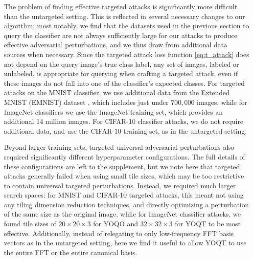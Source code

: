 \documentclass[letterpaper]{article}
\begin{document}
	The problem of finding effective targeted attacks is significantly more difficult than the untargeted setting. This is reflected in several necessary changes to our algorithm; most notably, we find that the datasets used in the previous section to query the classifier are not always sufficiently large for our attacks to produce effective adversarial perturbations, and we thus draw from additional data sources when necessary. Since the targeted attack loss function \eqref{eq:t_attack} does not depend on the query image's true class label, any set of images, labeled or unlabeled, is appropriate for querying when crafting a targeted attack, even if these images do not fall into one of the classifier's expected classes. For targeted attacks on the MNIST classifier, we use additional data from the Extended MNIST (EMNIST) dataset \cite{emnist}, which includes just under $700,000$ images, while for ImageNet classifiers we use the ImageNet training set, which provides an additional 14 million images. For CIFAR-10 classifier attacks, we do not require additional data, and use the CIFAR-10 training set, as in the untargeted setting.
	
	Beyond larger training sets, targeted universal adversarial perturbations also required significantly different hyperparameter configurations. The full details of these configurations are left to the supplement, but we note here that targeted attacks generally failed when using small tile sizes, which may be too restrictive to contain universal targeted perturbations. Instead, we required much larger search spaces: for MNIST and CIFAR-10 targeted attacks, this meant not using any tiling dimension reduction techniques, and directly optimizing a perturbation of the same size as the original image, while for ImageNet classifier attacks, we found tile sizes of $20 \times 20 \times 3$ for YOQO and $32 \times 32 \times 3$ for YOQT to be most effective. Additionally, instead of relegating to only low-frequency FFT basis vectors as in the untargeted setting, here we find it useful to allow YOQT to use the entire FFT or the entire canonical basis. 
	
	
\end{document}
